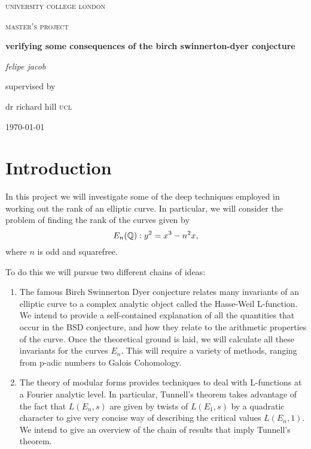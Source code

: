 \documentclass[12pt, a4paper]{report}
\begin{document}
\begin{titlepage}
	\centering
	{\scshape\large university college london \par}
	\vspace{1cm}
	{\scshape\large master's project \par}
	\vspace{1.5cm}
	{\huge\bfseries verifying some consequences of the birch swinnerton-dyer
    conjecture \par}
	\vspace{2cm}
	{\large\itshape felipe jacob\par}
	\vfill
	supervised by\par
	dr richard hill \textsc{ucl}

	\vfill

	{\large \today\par}
\end{titlepage}


\tableofcontents
\pagebreak


\chapter{Introduction}

In this project we will investigate some of the deep techniques employed in
working out the rank of an elliptic curve. In particular, we will consider the
problem of finding the rank of the curves given by
\[E_n({\mathbb Q}) : y^2 = x^3 - n^2 x,\]
where $n$ is odd and squarefree.

To do this we will pursue two different chains of ideas:
\begin{enumerate}
\item The famous Birch Swinnerton Dyer conjecture relates many invariants of an
  elliptic curve to a complex analytic object called the Hasse-Weil L-function.
  We intend to provide a self-contained explanation of all the quantities that occur
  in the BSD conjecture, and how they relate to the arithmetic properties of the
  curve. Once the theoretical ground is laid, we will calculate all these
  invariants for the curves $E_n$.
  This will require a variety of methods, ranging from p-adic numbers to
  Galois Cohomology.
\item The theory of modular forms provides techniques to deal with L-functions at
  a Fourier analytic level. In particular, Tunnell's theorem takes advantage of
  the fact that $L(E_n,s)$ are given by twists of $L(E_1,s)$ by a quadratic
  character to give
  very concise way of describing the
  critical values $L(E_n,1).$
  We intend to give an overview of the chain of results that imply Tunnell's theorem.
\end{enumerate}
\end{document}

